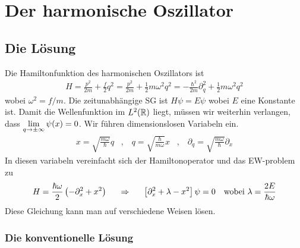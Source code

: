 \section{Der harmonische Oszillator}

\subsection{Die Lösung}

Die Hamiltonfunktion des harmonischen Oszillators ist
\begin{align*}
    H = \frac{p^2}{2m} + \frac{f}{2} q^2
    = \frac{p^2}{2m} + \frac{1}{2} m \omega^2 q^2
    = - \frac{\hbar^2}{2m} \partial_q^2 + \frac{1}{2} m \omega^2 q^2
\end{align*}
wobei $\omega^2 = f/m$. Die zeitunabhängige SG ist $H \psi = E \psi$ wobei $E$ eine
Konstante ist. Damit die Wellenfunktion im $L^2(\mathbb{R})$ liegt, müssen wir weiterhin
verlangen, dass $\lim\limits_{q \rightarrow \pm \infty} \psi(x) = 0$. Wir führen
dimensionslosen Variabeln ein.
\begin{align*}
    x = \sqrt{\frac{m \omega}{\hbar}} q
    \hspace{10pt} , \hspace{10pt}
    q = \sqrt{\frac{\hbar}{m \omega}} x
    \hspace{10pt} , \hspace{10pt}
    \partial_q = \sqrt{\frac{m \omega}{\hbar}} \partial_x
\end{align*}
In diesen variabeln vereinfacht sich der Hamiltonoperator und das EW-problem zu
\begin{align*}
    H = \frac{\hbar \omega}{2} \left( - \partial_x^2 + x^2 \right)
    \hspace{15pt} \Rightarrow \hspace{15pt}
    \left[ \partial_x^2 + \lambda - x^2 \right] \psi = 0
    \hspace{10pt} \text{wobei} \ \lambda = \frac{2E}{\hbar \omega}
\end{align*}
Diese Gleichung kann man auf verschiedene Weisen lösen.

\subsubsection{Die konventionelle Lösung}

